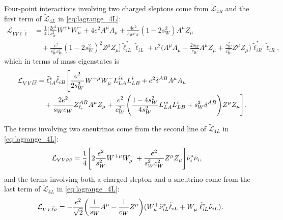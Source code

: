 Four-point interactions involving two charged sleptons come from $\tilde{\mathcal{L}}_{4R}$ and the first term of $\tilde{\mathcal{L}}_{4L}$ in \cref{eq:lagrange_4L}:
\begin{align*}
    \mathcal{L}_{VV\tilde\ell\tilde\ell}
    &= \frac{1}{4} \Biggl[
        \frac{2e^2}{s_W^2} W^{+\mu}W^-_\mu + 4e^2 A^\mu A_\mu
        + \frac{4e^2}{s_Wc_W}(1-2s_W^2) A^\mu Z_\mu
        \\ &\quad
        + \frac{e^2}{s_W^2c_W^2}(1 - 2s_W^2)^2 Z^\mu Z_\mu
    \Biggr] \tilde\ell_{iL}^*\tilde\ell_{iL}
    + e^2 \biggl( A^\mu A_\mu - \frac{2s_W}{c_W} A^\mu Z_\mu + \frac{s_W^2}{c_W^2} Z^\mu Z_\mu \biggr)
    \tilde\ell_{iR}^*\tilde\ell_{iR},
\end{align*}
which in terms of mass eigenstates is
\begin{equation}
    \begin{split}
        \mathcal{L}_{VV\tilde\ell\tilde\ell}
        &= \tilde\ell_{iA}^*\tilde\ell_{iB} \Biggl[
            \frac{e^2}{2s_W^2} W^{+\mu}W^-_\mu L^{i*}_{LA}L^i_{LB}
            + e^2 \delta^{AB} A^\mu A_\mu
            \\ & \quad
            + \frac{2e^2}{s_Wc_W} Z_{\ell_i}^{AB} A^\mu Z_\mu
            + \frac{e^2}{c_W^2} \Biggl(
                \frac{1-4s_W^2}{4s_W^2} L_{LA}^{i*}L_{LB}^i + s_W^2 \delta^{AB}
            \Biggr) Z^\mu Z_\mu
        \Biggr].
    \end{split}
    \label{eq:L_VVll}
\end{equation}

The terms involving two sneutrinos come from the second line of $\tilde{\mathcal{L}}_{4L}$ in \cref{eq:lagrange_4L}:
\begin{align}
    \hspace{-0.5em} \mathcal{L}_{VV\tilde\nu\tilde\nu}
    &= \frac{1}{4} \Biggl[
        2\frac{e^2}{s_W^2} W^{+\mu}W^-_\mu
        + \frac{e^2}{s_W^2c_W^2} Z^\mu Z_\mu
    \Biggr] \tilde\nu_i^*\tilde\nu_i,
    \label{eq:L_VVnunu}
\end{align}
and the terms involving both a charged slepton and a sneutrino come from the last term of $\tilde{\mathcal{L}}_{4L}$ in \cref{eq:lagrange_4L}:
\begin{equation}
    \hspace{-0.5em} \mathcal{L}_{VV\tilde\ell\tilde\nu}
    = -\frac{e^2}{\sqrt{2}} \biggl(
        \frac{1}{s_W} A^\mu - \frac{1}{c_W} Z^\mu
    \biggr)
    (W^+_\mu \tilde\nu_{iL}^*\tilde\ell_{iL} + W^-_\mu \tilde\ell_{iL}^*\tilde\nu_{iL}).
    \label{eq:L_VVlnu}
\end{equation}

